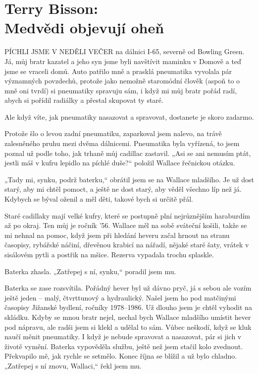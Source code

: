 \section{Terry Bisson: \\ Medvědi objevují oheň}

\noindent
PÍCHLI JSME V NEDĚLI VEČER na dálnici I-65, severně od Bowling Green. Já, můj bratr kazatel a jeho syn jsme byli navštívit maminku v Domově a teď jsme se vraceli domů. Auto patřilo mně a prasklá pneumatika vyvolala pár významných povzdechů, protože jako nemožně staromódní člověk (aspoň to o mně oni tvrdí) si pneumatiky spravuju sám, i když mi můj bratr pořád radí, abych si pořídil radiálky a přestal skupovat ty staré.

Ale když víte, jak pneumatiky nasazovat a spravovat, dostanete je skoro zadarmo.

Protože šlo o levou zadní pneumatiku, zaparkoval jsem nalevo, na trávě zalesněného pruhu mezi dvěma dálnicemi. Pneumatika byla vyřízená, to jsem poznal už podle toho, jak trhaně můj cadillac zastavil. „Asi se ani nemusím ptát, jestli máš v kufru lepidlo na píchlé duše?“ položil Wallace řečnickou otázku.

„Tady mi, synku, podrž baterku,“ obrátil jsem se na Wallace mladšího. Je už dost starý, aby mi chtěl pomoct, a ještě ne dost starý, aby věděl všechno líp než já. Kdybych se býval oženil a měl děti, takové bych si určitě přál.

Staré cadillaky mají velké kufry, které se postupně plní nejrůznějším haraburdím až po okraj. Ten můj je ročník ’56. Wallace měl na sobě sváteční košili, takže se mi nehnal na pomoc, když jsem při hledání heveru začal hrnout na stranu časopisy, rybářské náčiní, dřevěnou krabicí na nářadí, nějaké staré šaty, vrátek v sisálovém pytli a postřik na mšice. Rezerva vypadala trochu splaskle.

Baterka zhasla. „Zatřepej s ní, synku,“ poradil jsem mu.

Baterka se zase rozsvítila. Pořádný hever byl už dávno pryč, já s sebou ale vozím ještě jeden – malý, čtvrttunový a hydraulický. Našel jsem ho pod matčinými časopisy  Jižanské bydlení, ročníky 1978–1986. Už dlouho jsem je chtěl vyhodit na skládku. Kdyby se mnou bratr nejel, nechal bych Wallace mladšího umístit hever pod nápravu, ale radši jsem si klekl a udělal to sám. Vůbec neškodí, když se kluk naučí měnit pneumatiky. I když je nebude spravovat a nasazovat, pár si jich v životě vymění. Baterka vypověděla službu, ještě než jsem stačil kolo zvednout. Překvapilo mě, jak rychle se setmělo. Konec října se blížil a už bylo chladno. „Zatřepej s ní znovu, Wallaci,“ řekl jsem mu.

